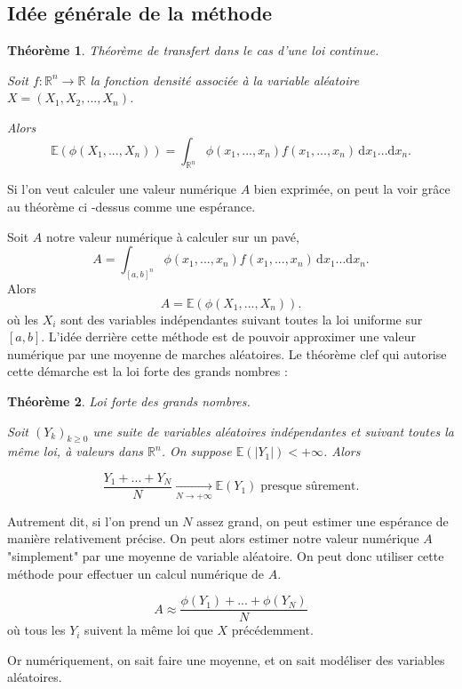 \documentclass[12pt, a4paper]{article}
\newtheorem*{theo}{Théorème} %
\begin{document}
\subsection{Idée générale de la méthode}

\begin{theo}
    Théorème de transfert dans le cas d'une loi continue.

    Soit $f : \mathbb{R}^n \rightarrow \mathbb{R}$ la fonction densité associée à la variable
    aléatoire $X = (X_1, X_2,...,X_n)$.

    Alors\[ \mathbb{E} \left( \phi(X_1, ..., X_n) \right) =  \int_{\mathbb{R}^n}
    \phi(x_1,...,x_n)f(x_1,...,x_n) \, \mathrm{d}x_1...\mathrm{d}x_n.  \] \end{theo}

Si l'on veut calculer une valeur numérique $A$ bien exprimée, on peut la voir grâce au théorème ci
-dessus comme une espérance.

Soit $A$ notre valeur numérique à calculer sur un pavé, \[ A = \int_{[a,b]^n}
\phi(x_1,...,x_n)f(x_1,...,x_n) \, \mathrm{d}x_1...\mathrm{d}x_n.  \] Alors \[ A = \mathbb{E} \left(
\phi(X_1, ..., X_n) \right).  \] où les $X_i$ sont des variables indépendantes suivant toutes la loi
uniforme sur $[a,b]$.  \medbreak L'idée derrière cette méthode est de pouvoir approximer une valeur
numérique par une moyenne de marches aléatoires. Le théorème clef qui autorise cette démarche est la
loi forte des grands nombres :

\begin{theo} Loi forte des grands nombres.

    Soit $(Y_k)_{k\ge 0}$ une suite de variables aléatoires indépendantes et suivant toutes la même
    loi, à valeurs dans $\mathbb{R}^n$. On suppose $\mathbb{E}(|Y_1|) < +\infty $. Alors

    \[ \frac{Y_1+...+Y_N}{N}\underset{N\to+\infty}{\longrightarrow}\mathbb{E}(Y_1)\; \text{presque
    sûrement.} \] \end{theo}

Autrement dit, si l'on prend un $N$ assez grand, on peut estimer une espérance de manière
relativement précise. On peut alors estimer notre valeur numérique $A$ "simplement" par une moyenne
de variable aléatoire. On peut donc utiliser cette méthode pour effectuer un calcul numérique de
$A$.

\[ A \approx \frac{\phi(Y_1)+...+\phi(Y_N)}{N} \] où tous les $Y_i$ suivent la même loi que $X$
précédemment.

Or numériquement, on sait faire une moyenne, et on sait modéliser des variables aléatoires.
\end{document}
